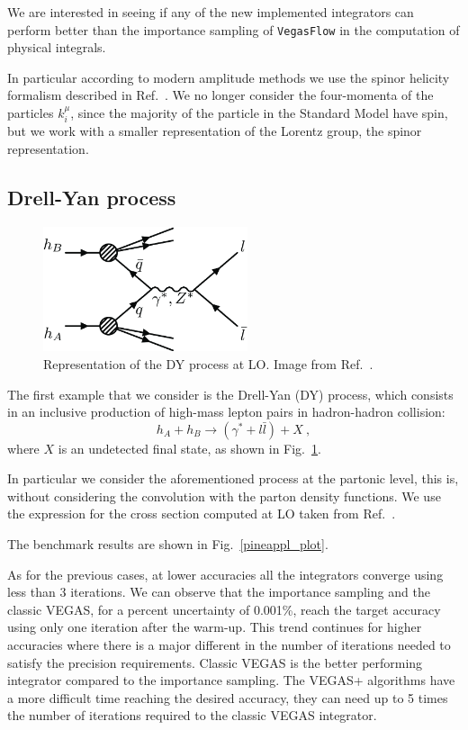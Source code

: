 \documentclass[../main/main.tex]{subfiles}
\begin{document}
We are interested in seeing if any of the new implemented integrators can perform better than the importance sampling of \texttt{VegasFlow} in the computation of physical integrals.

In particular according to modern amplitude methods we use the spinor helicity formalism described in Ref.~\cite{Dixon:1613349}. We no longer consider the four-momenta of the particles $k_i^\mu$, since the majority of the particle in the Standard Model have spin, but we work with a smaller representation of the Lorentz group, the spinor representation.
    
\subsection{Drell-Yan process}

\begin{figure}
	\centering
	\includegraphics[width=6cm]{../images/Drell-Yan-process-a-quark-of-one-hadron-and-an-antiquark-of-another-hadron-annihilate.png}
	\caption{Representation of the DY process at LO. Image from Ref.~\cite{article}.}
	\label{DY}
\end{figure}
The first example that we consider is the Drell-Yan (DY) process, which consists in an inclusive production of high-mass lepton pairs in hadron-hadron collision:
\begin{equation}
	h_A + h_B \rightarrow ( \gamma^* + l \bar{l}) + X  \ ,
\end{equation}
where $X$ is an undetected final state, as shown in Fig.~\ref{DY}.

In particular we consider the aforementioned process at the partonic level, this is, without considering the convolution with the parton density functions. We use the expression for the cross section computed at LO taken from Ref.~\cite{Carrazza_2020}.

The benchmark results are shown in Fig.~\ref{pineappl_plot}. 

As for the previous cases, at lower accuracies all the integrators converge using less than 3 iterations. We can observe that the importance sampling and the classic VEGAS, for a percent uncertainty of 0.001\%, reach the target accuracy using only one iteration after the warm-up.
This trend continues for higher accuracies where there is a major different in the number of iterations needed to satisfy the precision requirements. Classic VEGAS is the better performing integrator compared to the importance sampling. The VEGAS+ algorithms have a more difficult time reaching the desired accuracy, they can need up to 5 times the number of iterations required to the classic VEGAS integrator.
\end{document}
